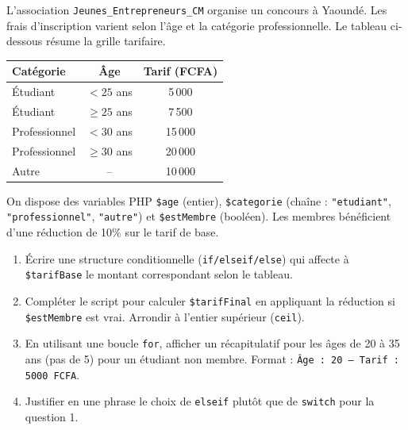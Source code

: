 \documentclass[11pt]{article}
\begin{document}
\begin{exercice}
L'association \texttt{Jeunes\_Entrepreneurs\_CM} organise un concours à Yaoundé. Les frais d'inscription varient selon l'âge et la catégorie professionnelle. Le tableau ci-dessous résume la grille tarifaire.

\begin{center}
\begin{tabular}{|l|c|c|}
\hline
\textbf{Catégorie} & \textbf{Âge} & \textbf{Tarif (FCFA)} \\
\hline
Étudiant & $< 25$ ans & 5\,000 \\
Étudiant & $\ge 25$ ans & 7\,500 \\
Professionnel & $< 30$ ans & 15\,000 \\
Professionnel & $\ge 30$ ans & 20\,000 \\
Autre & -- & 10\,000 \\
\hline
\end{tabular}
\end{center}

On dispose des variables PHP \texttt{\$age} (entier), \texttt{\$categorie} (chaîne : \texttt{"etudiant"}, \texttt{"professionnel"}, \texttt{"autre"}) et \texttt{\$estMembre} (booléen). Les membres bénéficient d'une réduction de 10\% sur le tarif de base.
\begin{enumerate}
    \item Écrire une structure conditionnelle (\texttt{if/elseif/else}) qui affecte à \texttt{\$tarifBase} le montant correspondant selon le tableau.
    \item Compléter le script pour calculer \texttt{\$tarifFinal} en appliquant la réduction si \texttt{\$estMembre} est vrai. Arrondir à l'entier supérieur (\texttt{ceil}).
    \item En utilisant une boucle \texttt{for}, afficher un récapitulatif pour les âges de 20 à 35 ans (pas de 5) pour un étudiant non membre. Format : \texttt{Âge : 20 -- Tarif : 5000 FCFA}.
    \item Justifier en une phrase le choix de \texttt{elseif} plutôt que de \texttt{switch} pour la question 1.
\end{enumerate}
\end{exercice}
\end{document}
